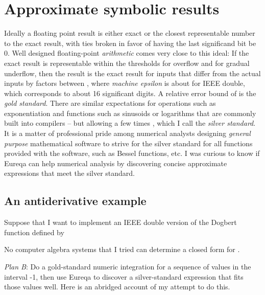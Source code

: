 \documentclass[12pt,english]{article}
\begin{document}
\section{Approximate symbolic results\label{sec:Approximate-symbolic-results}}

\begin{flushright}
\vspace{-5pt}

\par\end{flushright}

Ideally a floating point result is either exact or the closest representable
number to the exact result, with ties broken in favor of having the
last significand bit be 0. Well designed floating-point \textsl{arithmetic}
comes very close to this ideal: If the exact result is representable
within the thresholds for overflow and for gradual underflow, then
the result is the exact result for inputs that differ from the actual
inputs by factors between , where \textsl{machine
epsilon}  is about  for IEEE
double, which corresponds to about 16 significant digits. A relative
error bound of  is the \textsl{gold standard}.
There are similar expectations for operations such as exponentiation
and functions such as sinusoids or logarithms that are commonly built
into compilers -- but allowing a few times , which
I call the \textsl{silver standard}. It is a matter of professional
pride among numerical analysts designing \textsl{general purpose}
mathematical software to strive for the silver standard for all functions
provided with the software, such as Bessel functions, etc. I was curious
to know if Eureqa can help numerical analysis by discovering concise
approximate expressions that meet the silver standard.


\subsection{An antiderivative example\label{sub:An-antiderivative-example}}

Suppose that I want to implement an IEEE double version of the Dogbert
 function defined by\vspace{-5pt}

No computer algebra systems that I tried can determine a closed form
for .

\textsl{Plan B}: Do a gold-standard numeric integration for a sequence
of  values in the interval -1, then use Eureqa to
discover a silver-standard expression that fits those values well.
Here is an abridged account of my attempt to do this.\vspace{-5pt}
\end{document}
